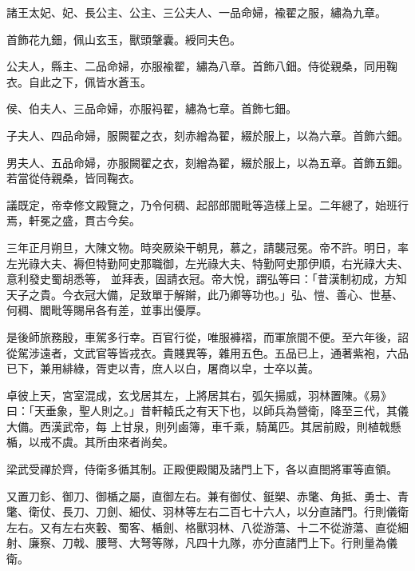 \begin{pinyinscope}
 諸王太妃、妃、長公主、公主、三公夫人、一品命婦，褕翟之服，繡為九章。



 首飾花九鈿，佩山玄玉，獸頭鞶囊。綬同夫色。



 公夫人，縣主、二品命婦，亦服褕翟，繡為八章。首飾八鈿。侍從親桑，同用鞠衣。自此之下，佩皆水蒼玉。



 侯、伯夫人、三品命婦，亦服祃翟，繡為七章。首飾七鈿。



 子夫人、四品命婦，服闕翟之衣，刻赤繒為翟，綴於服上，以為六章。首飾六鈿。



 男夫人、五品命婦，亦服闕翟之衣，刻繒為翟，綴於服上，以為五章。首飾五鈿。若當從侍親桑，皆同鞠衣。



 議既定，帝幸修文殿覽之，乃令何稠、起部郎閻毗等造樣上呈。二年總了，始班行焉，軒冕之盛，貫古今矣。



 三年正月朔旦，大陳文物。時突厥染干朝見，慕之，請襲冠冕。帝不許。明日，率左光祿大夫、褥但特勤阿史那職御，左光祿大夫、特勤阿史那伊順，右光祿大夫、意利發史蜀胡悉等，
 並拜表，固請衣冠。帝大悅，謂弘等曰：「昔漢制初成，方知天子之貴。今衣冠大備，足致單于解辮，此乃卿等功也。」弘、愷、善心、世基、何稠、閻毗等賜帛各有差，並事出優厚。



 是後師旅務殷，車駕多行幸。百官行從，唯服褲褶，而軍旅間不便。至六年後，詔從駕涉遠者，文武官等皆戎衣。貴賤異等，雜用五色。五品已上，通著紫袍，六品已下，兼用緋綠，胥吏以青，庶人以白，屠商以皁，士卒以黃。



 卓彼上天，宮室混成，玄戈居其左，上將居其右，弧矢揚威，羽林置陳。《易》曰：「天垂象，聖人則之。」昔軒轅氏之有天下也，以師兵為營衛，降至三代，其儀大備。西漢武帝，每
 上甘泉，則列鹵簿，車千乘，騎萬匹。其居前殿，則植戟懸楯，以戒不虞。其所由來者尚矣。



 梁武受禪於齊，侍衛多循其制。正殿便殿閣及諸門上下，各以直閤將軍等直領。



 又置刀釤、御刀、御楯之屬，直御左右。兼有御仗、鋌槊、赤氅、角抵、勇士、青氅、衛仗、長刀、刀劍、細仗、羽林等左右二百七十六人，以分直諸門。行則儀衛左右。又有左右夾轂、蜀客、楯劍、格獸羽林、八從游蕩、十二不從游蕩、直從細射、廉察、刀戟、腰弩、大弩等隊，凡四十九隊，亦分直諸門上下。行則量為儀衛。




\end{pinyinscope}
